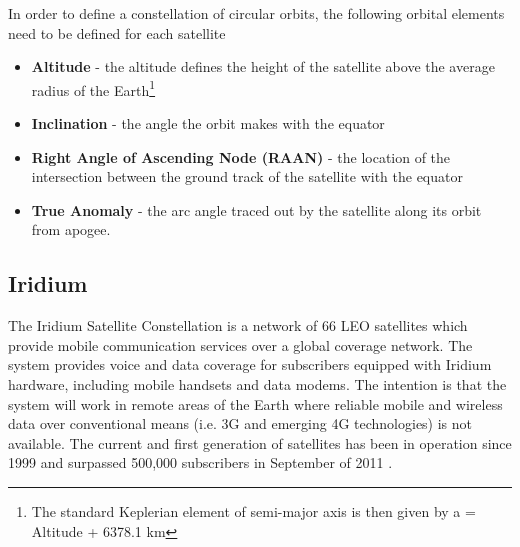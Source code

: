 In order to define a constellation of circular orbits, the following orbital elements need to be defined for each satellite \cite{wertz1999space}
\begin{itemize}
	\item \textbf{Altitude} - the altitude defines the height of the satellite above the average radius of the Earth\footnote{The standard Keplerian element of semi-major axis is then given by a = Altitude + 6378.1 km }
	\item \textbf{Inclination} - the angle the orbit makes with the equator
	\item \textbf{Right Angle of Ascending Node (RAAN)} - the location of the intersection between the ground track of the satellite with the equator
	\item \textbf{True Anomaly} - the arc angle traced out by the satellite along its orbit from apogee.
\end{itemize}

\subsection{Iridium} \label{sec:iridium}
The Iridium Satellite Constellation is a network of 66 LEO satellites which provide mobile communication services over a global coverage network. The system provides voice and data coverage for subscribers equipped with Iridium hardware, including mobile handsets and data modems. The intention is that the system will work in remote areas of the Earth where reliable mobile and wireless data over conventional means (i.e. 3G and emerging 4G technologies) is not available. The current and first generation of satellites has been in operation since 1999 and surpassed 500,000 subscribers in September of 2011 \cite{Iridium_subscribers_2011}.

